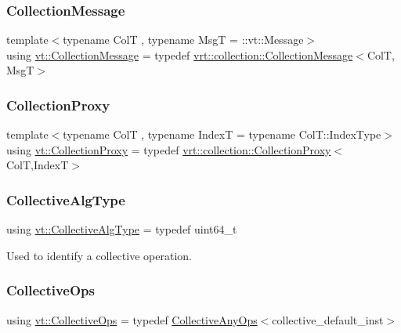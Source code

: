 \subsubsection{\texorpdfstring{Collection\+Message}{CollectionMessage}}
{\footnotesize\ttfamily template$<$typename ColT , typename MsgT  = \+::vt\+::\+Message$>$ \\
using \hyperlink{namespacevt_ae7700e12f79c0fec16964aab84838428}{vt\+::\+Collection\+Message} = typedef \hyperlink{structvt_1_1vrt_1_1collection_1_1_collection_message}{vrt\+::collection\+::\+Collection\+Message}$<$ColT, MsgT$>$}

\mbox{\label{namespacevt_a0d58a693bfb96e0ce5d145692a1a1f98}} 
\subsubsection{\texorpdfstring{Collection\+Proxy}{CollectionProxy}}
{\footnotesize\ttfamily template$<$typename ColT , typename IndexT  = typename Col\+T\+::\+Index\+Type$>$ \\
using \hyperlink{namespacevt_a0d58a693bfb96e0ce5d145692a1a1f98}{vt\+::\+Collection\+Proxy} = typedef \hyperlink{structvt_1_1vrt_1_1collection_1_1_collection_proxy}{vrt\+::collection\+::\+Collection\+Proxy}$<$ColT,IndexT$>$}

\mbox{\label{namespacevt_a5ffcf8e168b77b0f36e11b616049a1cf}} 
\subsubsection{\texorpdfstring{Collective\+Alg\+Type}{CollectiveAlgType}}
{\footnotesize\ttfamily using \hyperlink{namespacevt_a5ffcf8e168b77b0f36e11b616049a1cf}{vt\+::\+Collective\+Alg\+Type} = typedef uint64\+\_\+t}



Used to identify a collective operation. 

\mbox{\label{namespacevt_a776b30f114cff62549e798fedeb6222b}} 
\subsubsection{\texorpdfstring{Collective\+Ops}{CollectiveOps}}
{\footnotesize\ttfamily using \hyperlink{namespacevt_a776b30f114cff62549e798fedeb6222b}{vt\+::\+Collective\+Ops} = typedef \hyperlink{structvt_1_1_collective_any_ops}{Collective\+Any\+Ops}$<$collective\+\_\+default\+\_\+inst$>$}

